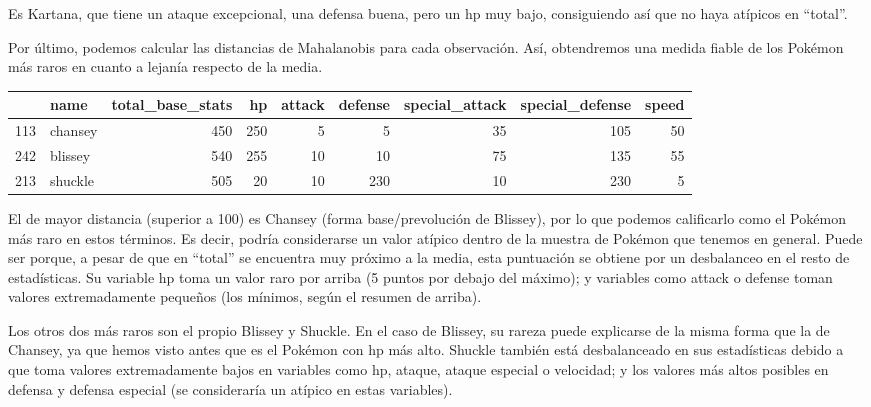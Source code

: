 \documentclass[
  12pt,
]{extreport}
\begin{document}
Es Kartana, que tiene un ataque excepcional, una defensa buena, pero un
hp muy bajo, consiguiendo así que no haya atípicos en ``total''.

Por último, podemos calcular las distancias de Mahalanobis para cada
observación. Así, obtendremos una medida fiable de los Pokémon más raros
en cuanto a lejanía respecto de la media.

\begin{table}[H]
\centering\begingroup\fontsize{9.5}{11.5}\selectfont

\begin{tabular}{llrrrrrrr}
\toprule
  & name & total\_base\_stats & hp & attack & defense & special\_attack & special\_defense & speed\\
\midrule
113 & chansey & 450 & 250 & 5 & 5 & 35 & 105 & 50\\
242 & blissey & 540 & 255 & 10 & 10 & 75 & 135 & 55\\
213 & shuckle & 505 & 20 & 10 & 230 & 10 & 230 & 5\\
\bottomrule
\end{tabular}
\endgroup{}
\end{table}

El de mayor distancia (superior a 100) es Chansey (forma
base/prevolución de Blissey), por lo que podemos calificarlo como el
Pokémon más raro en estos términos. Es decir, podría considerarse un
valor atípico dentro de la muestra de Pokémon que tenemos en general.
Puede ser porque, a pesar de que en ``total'' se encuentra muy próximo a
la media, esta puntuación se obtiene por un desbalanceo en el resto de
estadísticas. Su variable hp toma un valor raro por arriba (5 puntos por
debajo del máximo); y variables como attack o defense toman valores
extremadamente pequeños (los mínimos, según el resumen de arriba).

Los otros dos más raros son el propio Blissey y Shuckle. En el caso de
Blissey, su rareza puede explicarse de la misma forma que la de Chansey,
ya que hemos visto antes que es el Pokémon con hp más alto. Shuckle
también está desbalanceado en sus estadísticas debido a que toma valores
extremadamente bajos en variables como hp, ataque, ataque especial o
velocidad; y los valores más altos posibles en defensa y defensa
especial (se consideraría un atípico en estas variables).
\end{document}
